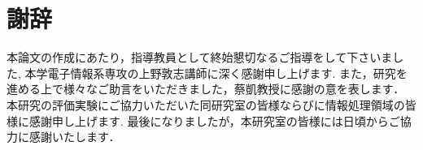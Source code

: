 \documentclass[\homedir/main.tex]{subfiles}
\begin{document}
\chapter*{謝辞}\label{chap:acknowledgment}
本論文の作成にあたり，指導教員として終始懇切なるご指導をして下さいました,
本学電子情報系専攻の上野敦志講師に深く感謝申し上げます.
また，研究を進める上で様々なご助言をいただきました，蔡凱教授に感謝の意を表します．\\
本研究の評価実験にご協力いただいた同研究室の皆様ならびに情報処理領域の皆様に感謝申し上げます.
最後になりましたが，本研究室の皆様には日頃からご協力に感謝いたします．
\end{document}

